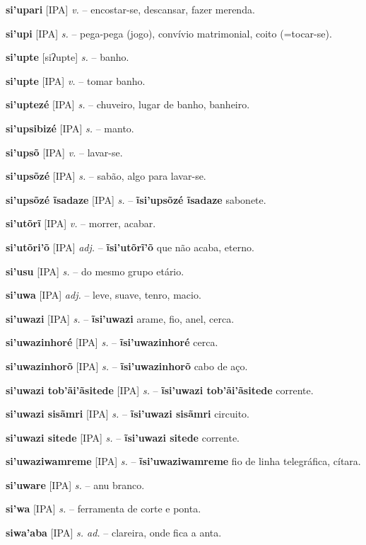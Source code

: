 \textbf{si'upari} [IPA] \textit{v.} -- encostar-se, descansar, fazer merenda.

\textbf{si'upi} [IPA] \textit{s.} -- pega-pega (jogo), convívio matrimonial, coito (=tocar-se).

\textbf{si'upte} [siʔupte] \textit{s.} -- banho.

\textbf{si'upte} [IPA] \textit{v.} -- tomar banho.

\textbf{si'uptezé} [IPA] \textit{s.} -- chuveiro, lugar de banho, banheiro.

\textbf{si'upsibizé} [IPA] \textit{s.} -- manto.

\textbf{si'upsõ} [IPA] \textit{v.} -- lavar-se.

\textbf{si'upsõzé} [IPA] \textit{s.} -- sabão, algo para lavar-se.

\textbf{si'upsõzé ĩsadaze} [IPA] \textit{s.} -- \textbf{ĩsi'upsõzé ĩsadaze} sabonete.

\textbf{si'utõrĩ} [IPA] \textit{v.} -- morrer, acabar.

\textbf{si'utõri'õ} [IPA] \textit{adj.} -- \textbf{ĩsi'utõrĩ'õ} que não acaba, eterno.

\textbf{si'usu} [IPA] \textit{s.} -- do mesmo grupo etário.

\textbf{si'uwa} [IPA] \textit{adj.} -- leve, suave, tenro, macio.

\textbf{si'uwazi} [IPA] \textit{s.} -- \textbf{ĩsi'uwazi} arame, fio, anel, cerca.

\textbf{si'uwazinhoré} [IPA] \textit{s.} -- \textbf{ĩsi'uwazinhoré} cerca.

\textbf{si'uwazinhorõ} [IPA] \textit{s.} -- \textbf{ĩsi'uwazinhorõ} cabo de aço.

\textbf{si'uwazi tob'ãi'ãsitede} [IPA] \textit{s.} -- \textbf{ĩsi'uwazi tob'ãi'ãsitede} corrente.

\textbf{si'uwazi sisãmri} [IPA] \textit{s.} -- \textbf{ĩsi'uwazi sisãmri} circuito.

\textbf{si'uwazi sitede} [IPA] \textit{s.} -- \textbf{ĩsi'uwazi sitede} corrente.

\textbf{si'uwaziwamreme} [IPA] \textit{s.} -- \textbf{ĩsi'uwaziwamreme} fio de linha telegráfica, cítara.

\textbf{si'uware} [IPA] \textit{s.} -- anu branco.

\textbf{si'wa} [IPA] \textit{s.} -- ferramenta de corte e ponta.

\textbf{siwa'aba} [IPA] \textit{s. ad.} -- clareira, onde fica a anta.

